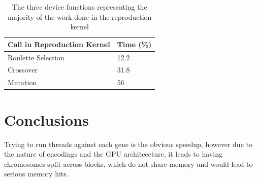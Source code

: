 \documentclass[11pt]{article}       %
\begin{document}
\begin{table}[h]
\centering
{}
\caption{nsys profile of a 1000 generation GPU run}
\label{tab:gpu-profile}
\end{table}

\begin{table}[]
\begin{tabular}{@{}ll@{}}
\toprule
Call in Reproduction Kernel & Time (\%) \\ \midrule
Roulette Selection          & 12.2     \\
Crossover                   & 31.8     \\
Mutation                    & 56       \\ \bottomrule
\end{tabular}
\caption{The three device functions representing the majority of the work done in the reproduction kernel}
\label{tab:rep-kernel-breakdown}
\end{table}

\section{Conclusions} \label{conc}



Trying to run threads against each gene is the obvious speedup, however due to the nature of encodings and the GPU architeccture, it leads to having chromosomes split across blocks, which do not share memory and would lead to serious memory hits.


\end{document}
